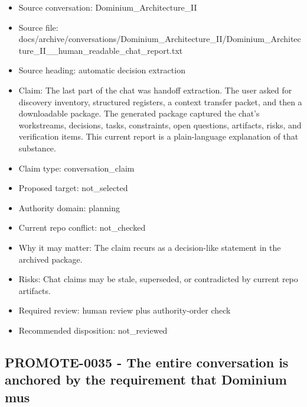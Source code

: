 \documentclass[11pt,a4paper]{report}
\begin{document}
\begin{itemize}
\item Source conversation: Dominium\_Architecture\_II
\item Source file: docs/archive/conversations/Dominium\_Architecture\_II/Dominium\_Architecture\_II\_\_human\_readable\_chat\_report.txt
\item Source heading: automatic decision extraction
\item Claim: The last part of the chat was handoff extraction. The user asked for discovery inventory, structured registers, a context transfer packet, and then a downloadable package. The generated package captured the chat's workstreams, decisions, tasks, constraints, open questions, artifacts, risks, and verification items. This current report is a plain-language explanation of that substance.
\item Claim type: conversation\_claim
\item Proposed target: not\_selected
\item Authority domain: planning
\item Current repo conflict: not\_checked
\item Why it may matter: The claim recurs as a decision-like statement in the archived package.
\item Risks: Chat claims may be stale, superseded, or contradicted by current repo artifacts.
\item Required review: human review plus authority-order check
\item Recommended disposition: not\_reviewed
\end{itemize}

\subsection{PROMOTE-0035 - The entire conversation is anchored by the requirement that Dominium mus}
\end{document}
